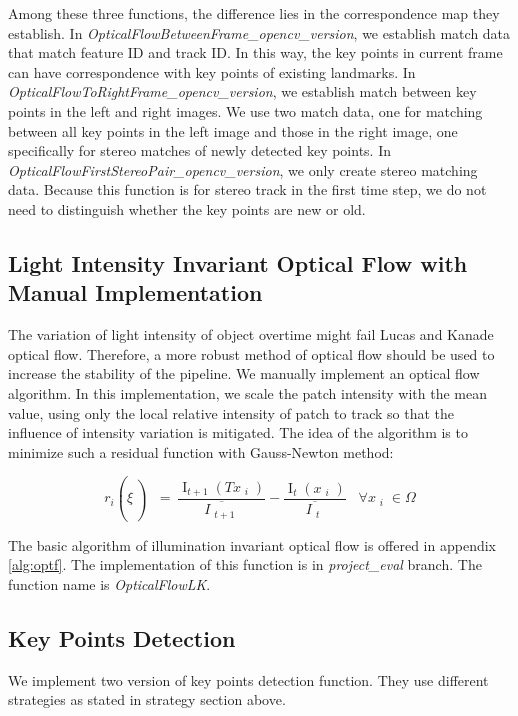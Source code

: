 \documentclass[11pt]{easychair}
\begin{document}
Among these three functions, the difference lies in the correspondence map they establish. In \emph{OpticalFlowBetweenFrame\_opencv\_version}, we establish match data that match feature ID and track ID. In this way, the key points in current frame can have correspondence with key points of existing landmarks. In \emph{OpticalFlowToRightFrame\_opencv\_version}, we establish match between key points in the left and right images. We use two match data, one for matching between all key points in the left image and those in the right image, one specifically for stereo matches of newly detected key points. In \emph{OpticalFlowFirstStereoPair\_opencv\_version}, we only create stereo matching data. Because this function is for stereo track in the first time step, we do not need to distinguish whether the key points are new or old.

\subsection{Light Intensity Invariant Optical Flow with Manual Implementation}
The variation of light intensity of object overtime might fail Lucas and Kanade optical flow. Therefore, a more robust method of optical flow should be used to increase the stability of the pipeline. We manually implement an optical flow algorithm. In this implementation, we scale the patch intensity with the mean value, using only the local relative intensity of patch to track so that the influence of intensity variation is mitigated. The idea of the algorithm is to minimize such a residual function with Gauss-Newton method\cite{basalt}:

\[{{r_i \left(  \xi  \left) \text{ }=\text{ }\frac{{\mathop{{I}}\nolimits_{{t+1}} \left( Tx\mathop{{}}\nolimits_{{i}} \right) }}{{ \overline {I\mathop{{}}\nolimits_{{t+1}}}}}\right. \right. }-\frac{{\mathop{{I}}\nolimits_{{t}} \left( x\mathop{{}}\nolimits_{{i}} \right) }}{{ \overline {I\mathop{{}}\nolimits_{{t}}}}}\text{ }\text{ }\ \ \forall x\mathop{{}}\nolimits_{{i}} \in  \Omega }\]

The basic algorithm of illumination invariant optical flow is offered in appendix \ref{alg:optf}. The implementation of this function is in \emph{project\_eval} branch. The function name is \emph{OpticalFlowLK}.

\subsection{Key Points Detection}
We implement two version of key points detection function. They use different strategies as stated in strategy section above. 
\end{document}
